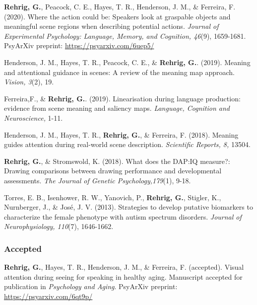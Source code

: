 \textbf{Rehrig, G.}, Peacock, C. E., Hayes, T. R., Henderson, J. M., \& Ferreira, F. (2020). Where the action could be: Speakers look at graspable objects and meaningful scene regions when describing potential actions. \textit{Journal of Experimental Psychology: Language, Memory, and Cognition, 46}(9), 1659-1681. PsyArXiv preprint: \url{https://psyarxiv.com/6uep5/}

Henderson, J. M., Hayes, T. R., Peacock, C. E., \& \textbf{Rehrig, G.}. (2019). Meaning and attentional guidance in scenes: A review of the meaning map approach. \textit{Vision, 3}(2), 19.


Ferreira,F., \& \textbf{Rehrig, G.}. (2019). Linearisation during language production: evidence from scene meaning and saliency maps. \textit{Language, Cognition and Neuroscience,} 1-11.


Henderson, J. M., Hayes, T. R., \textbf{Rehrig, G.}, \& Ferreira, F. (2018). Meaning guides attention during real-world scene description. \textit{Scientific Reports, 8,} 13504. 


\textbf{Rehrig, G.}, \& Stromswold, K. (2018). What does the DAP:IQ measure?: Drawing comparisons between drawing performance and developmental assessments. \textit{The Journal of Genetic Psychology,179}(1), 9-18.


Torres, E. B., Isenhower, R. W., Yanovich, P., \textbf{Rehrig, G.}, Stigler, K., Nurnberger, J., \& Jos\'e, J. V. (2013). Strategies to develop putative biomarkers to characterize the female phenotype with autism spectrum disorders. \textit{Journal of Neurophysiology, 110}(7), 1646-1662.

\subsubsection*{Accepted}

\textbf{Rehrig, G.}, Hayes, T. R., Henderson, J. M., \& Ferreira, F. (accepted). Visual attention during seeing for speaking in healthy aging. Manuscript accepted for publication in \textit{Psychology and Aging}. PsyArXiv preprint: \url{https://psyarxiv.com/6qt9p/}



